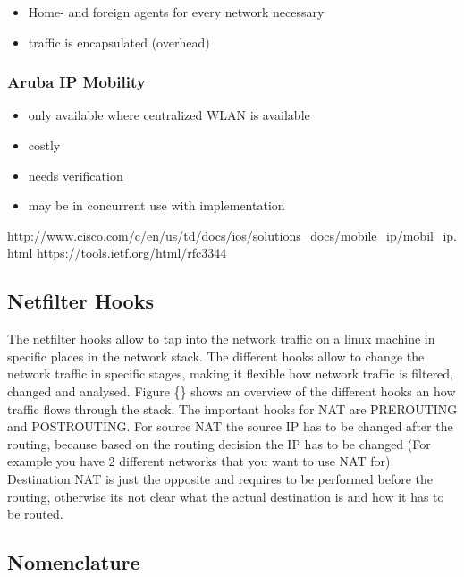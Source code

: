 \begin{itemize}
\itemsep1pt\parskip0pt
\item
  Home- and foreign agents for every network necessary
\item
  traffic is encapsulated (overhead)
\end{itemize}

\subsubsection{Aruba IP Mobility}\label{aruba-ip-mobility}

\begin{itemize}
\itemsep1pt\parskip0pt
\item
  only available where centralized WLAN is available
\item
  costly
\item
  needs verification
\item
  may be in concurrent use with implementation
\end{itemize}

http://www.cisco.com/c/en/us/td/docs/ios/solutions\_docs/mobile\_ip/mobil\_ip.html
https://tools.ietf.org/html/rfc3344

\subsection{Netfilter Hooks}\label{netfilter-hooks}

The netfilter hooks allow to tap into the network traffic on a linux
machine in specific places in the network stack. The different hooks
allow to change the network traffic in specific stages, making it
flexible how network traffic is filtered, changed and analysed. Figure
\{\} shows an overview of the different hooks an how traffic flows
through the stack. The important hooks for NAT are PREROUTING and
POSTROUTING. For source NAT the source IP has to be changed after the
routing, because based on the routing decision the IP has to be changed
(For example you have 2 different networks that you want to use NAT
for). Destination NAT is just the opposite and requires to be performed
before the routing, otherwise its not clear what the actual destination
is and how it has to be routed.

\subsection{Nomenclature}\label{nomenclature}

